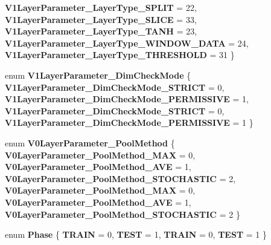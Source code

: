 \begin{DoxyCompactItemize}
{\bfseries V1\+Layer\+Parameter\+\_\+\+Layer\+Type\+\_\+\+S\+P\+L\+IT} = 22, 
\newline
{\bfseries V1\+Layer\+Parameter\+\_\+\+Layer\+Type\+\_\+\+S\+L\+I\+CE} = 33, 
{\bfseries V1\+Layer\+Parameter\+\_\+\+Layer\+Type\+\_\+\+T\+A\+NH} = 23, 
{\bfseries V1\+Layer\+Parameter\+\_\+\+Layer\+Type\+\_\+\+W\+I\+N\+D\+O\+W\+\_\+\+D\+A\+TA} = 24, 
{\bfseries V1\+Layer\+Parameter\+\_\+\+Layer\+Type\+\_\+\+T\+H\+R\+E\+S\+H\+O\+LD} = 31
 \}
\item 
\mbox{\label{namespacecaffe_adf727d7f79f08a7f1419e0605175bc85}} 
enum {\bfseries V1\+Layer\+Parameter\+\_\+\+Dim\+Check\+Mode} \{ {\bfseries V1\+Layer\+Parameter\+\_\+\+Dim\+Check\+Mode\+\_\+\+S\+T\+R\+I\+CT} = 0, 
{\bfseries V1\+Layer\+Parameter\+\_\+\+Dim\+Check\+Mode\+\_\+\+P\+E\+R\+M\+I\+S\+S\+I\+VE} = 1, 
{\bfseries V1\+Layer\+Parameter\+\_\+\+Dim\+Check\+Mode\+\_\+\+S\+T\+R\+I\+CT} = 0, 
{\bfseries V1\+Layer\+Parameter\+\_\+\+Dim\+Check\+Mode\+\_\+\+P\+E\+R\+M\+I\+S\+S\+I\+VE} = 1
 \}
\item 
\mbox{\label{namespacecaffe_ab08663996d43522220c91bc42fbce27a}} 
enum {\bfseries V0\+Layer\+Parameter\+\_\+\+Pool\+Method} \{ \newline
{\bfseries V0\+Layer\+Parameter\+\_\+\+Pool\+Method\+\_\+\+M\+AX} = 0, 
{\bfseries V0\+Layer\+Parameter\+\_\+\+Pool\+Method\+\_\+\+A\+VE} = 1, 
{\bfseries V0\+Layer\+Parameter\+\_\+\+Pool\+Method\+\_\+\+S\+T\+O\+C\+H\+A\+S\+T\+IC} = 2, 
{\bfseries V0\+Layer\+Parameter\+\_\+\+Pool\+Method\+\_\+\+M\+AX} = 0, 
\newline
{\bfseries V0\+Layer\+Parameter\+\_\+\+Pool\+Method\+\_\+\+A\+VE} = 1, 
{\bfseries V0\+Layer\+Parameter\+\_\+\+Pool\+Method\+\_\+\+S\+T\+O\+C\+H\+A\+S\+T\+IC} = 2
 \}
\item 
\mbox{\label{namespacecaffe_ae5c0b3a0799bdeaa06cc4dcbe95f0425}} 
enum {\bfseries Phase} \{ {\bfseries T\+R\+A\+IN} = 0, 
{\bfseries T\+E\+ST} = 1, 
{\bfseries T\+R\+A\+IN} = 0, 
{\bfseries T\+E\+ST} = 1
 \}
\end{DoxyCompactItemize}
